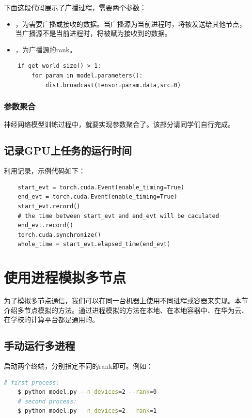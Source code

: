 下面这段代码展示了广播过程，需要两个参数：
\begin{itemize}
    \item {}，为需要广播或接收的数据。当广播源为当前进程时，将被发送给其他节点，当广播源不是当前进程时，将被赋为接收到的数据。
    \item {}，为广播源的rank。
\end{itemize}

\begin{lstlisting}
    if get_world_size() > 1:
        for param in model.parameters():
            dist.broadcast(tensor=param.data,src=0)
\end{lstlisting}

\subsubsection{参数聚合}

神经网络模型训练过程中，就要实现参数聚合了。该部分请同学们自行完成。

\subsection{记录GPU上任务的运行时间}

利用记录，示例代码如下：
\begin{lstlisting}
    start_evt = torch.cuda.Event(enable_timing=True)
    end_evt = torch.cuda.Event(enable_timing=True)
    start_evt.record()
    # the time between start_evt and end_evt will be caculated
    end_evt.record()
    torch.cuda.synchronize()
    whole_time = start_evt.elapsed_time(end_evt)
\end{lstlisting}

\section{使用进程模拟多节点}

为了模拟多节点通信，我们可以在同一台机器上使用不同进程或容器来实现。本节介绍多节点模拟的方法。通过进程模拟的方法在本地、在本地容器中、在华为云、在学校的计算平台都是通用的。

\subsection{手动运行多进程}
启动两个终端，分别指定不同的rank即可。例如：
\begin{lstlisting}[language=bash]
    # first process:
    $ python model.py --n_devices=2 --rank=0
    # second process:
    $ python model.py --n_devices=2 --rank=1
\end{lstlisting}


